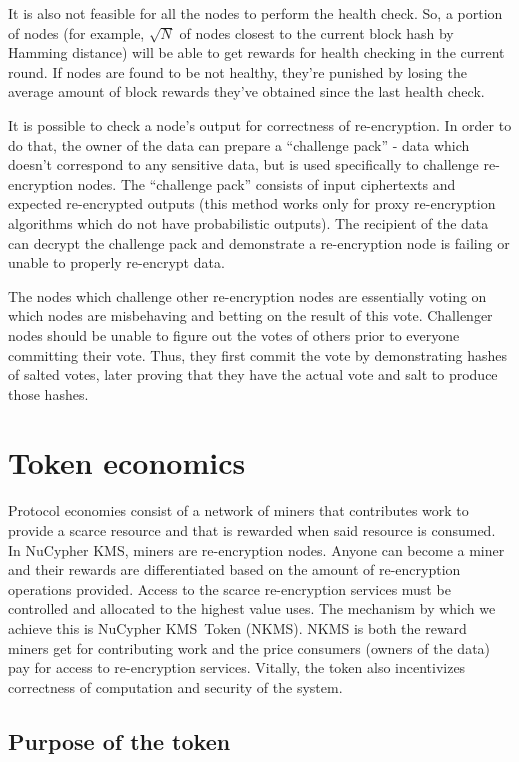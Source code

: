 \documentclass[longbibliography,nofootinbib]{revtex4-1}
\newcommand{\kms}{NuCypher KMS}
\begin{document}
It is also not feasible for all the nodes to perform the health check.
So, a portion of nodes (for example, $\sqrt{N}$ of nodes closest to the current block hash by Hamming distance) will be able to get rewards for health checking
in the current round.
If nodes are found to be not healthy, they're punished by losing the average amount of block rewards they've obtained since the last health check.

It is possible to check a node's output for correctness of re-encryption.
In order to do that, the owner of the data can prepare a ``challenge pack'' - data which doesn't correspond to any sensitive data, but is used specifically to
challenge re-encryption nodes.
The ``challenge pack'' consists of input ciphertexts and expected re-encrypted outputs
(this method works only for proxy re-encryption algorithms which do not have probabilistic outputs).
The recipient of the data can decrypt the challenge pack and demonstrate a re-encryption node is failing or unable to properly re-encrypt data.

The nodes which challenge other re-encryption nodes are essentially voting on which nodes are misbehaving and betting on the result of this vote.
Challenger nodes should be unable to figure out the votes of others prior to everyone committing their vote.
Thus, they first commit the vote by demonstrating hashes of salted votes, later proving that they have the actual vote and salt to produce those hashes.

\section{Token economics}
\label{sec:token}

Protocol economies consist of a network of miners that contributes work to provide a scarce resource and that is
rewarded when said resource is consumed.
In \kms, miners are re-encryption nodes.
Anyone can become a miner and their rewards are differentiated based on the amount of re-encryption operations provided.
Access to the scarce re-encryption services must be controlled and allocated to the highest value uses.
The mechanism by which we achieve this is \kms~Token (NKMS).
NKMS is both the reward miners get for contributing work and the price consumers (owners of the data) pay for access to re-encryption services.
Vitally, the token also incentivizes correctness of computation and security of the system.

\subsection{Purpose of the token}
\end{document}
